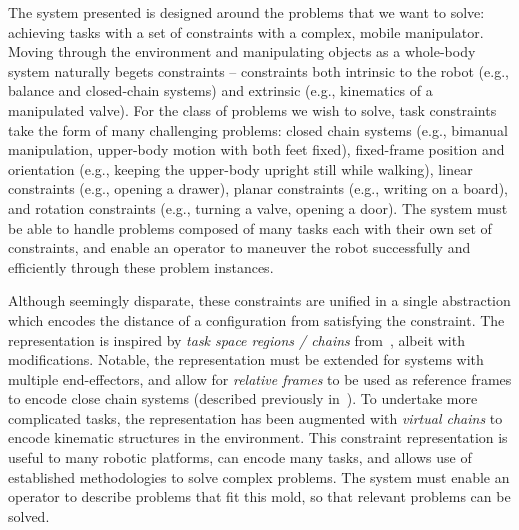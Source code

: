 The system presented is designed around the problems that we want to solve: achieving tasks with a set of constraints with a complex, mobile manipulator.
Moving through the environment and manipulating objects as a whole-body system naturally begets constraints --
constraints both intrinsic to the robot (e.g., balance and closed-chain systems) and extrinsic (e.g., kinematics of a manipulated valve).
For the class of problems we wish to solve, task constraints take the form of many challenging problems:
  closed chain systems (e.g., bimanual manipulation, upper-body motion with both feet fixed),
  fixed-frame position and orientation (e.g., keeping the upper-body upright still while walking),
  linear constraints (e.g., opening a drawer),
  planar constraints (e.g., writing on a board),
  and rotation constraints (e.g., turning a valve, opening a door).
The system must be able to handle problems composed of many tasks each with their own set of constraints, and enable an operator to maneuver the robot successfully and efficiently through these problem instances.

Although seemingly disparate, these constraints are unified in a single abstraction which encodes the distance of a configuration from satisfying the constraint.
The representation is inspired by \emph{task space regions / chains} from~\cite{Berenson2011}, albeit with modifications.
Notable, the representation must be extended for systems with multiple end-effectors, and allow for \emph{relative frames} to be used as reference frames to encode close chain systems (described previously in~\cite{Baker2017}).
To undertake more complicated tasks, the representation has been augmented with \emph{virtual chains} to encode kinematic structures in the environment.
This constraint representation is useful to many robotic platforms, can encode many tasks, and allows use of established methodologies to solve complex problems.
The system must enable an operator to describe problems that fit this mold, so that relevant problems can be solved.

